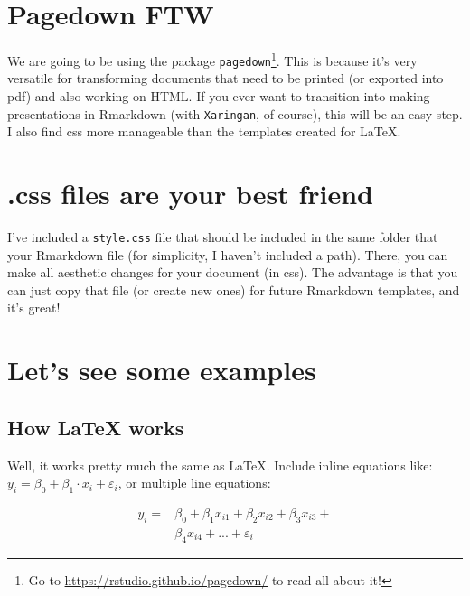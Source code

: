 \documentclass[
]{article}
\begin{document}
\hypertarget{pagedown-ftw}{%
\section{Pagedown FTW}\label{pagedown-ftw}}

We are going to be using the package \texttt{pagedown}\footnote{Go to
  \url{https://rstudio.github.io/pagedown/} to read all about it!}. This
is because it's very versatile for transforming documents that need to
be printed (or exported into pdf) and also working on HTML. If you ever
want to transition into making presentations in Rmarkdown (with
\texttt{Xaringan}, of course), this will be an easy step. I also find
css more manageable than the templates created for LaTeX.

\hypertarget{css-files-are-your-best-friend}{%
\section{.css files are your best
friend}\label{css-files-are-your-best-friend}}

I've included a \texttt{style.css} file that should be included in the
same folder that your Rmarkdown file (for simplicity, I haven't included
a path). There, you can make all aesthetic changes for your document (in
css). The advantage is that you can just copy that file (or create new
ones) for future Rmarkdown templates, and it's great!

\newpage

\hypertarget{lets-see-some-examples}{%
\section{Let's see some examples}\label{lets-see-some-examples}}

\hypertarget{how-latex-works}{%
\subsection{How LaTeX works}\label{how-latex-works}}

Well, it works pretty much the same as LaTeX. Include inline equations
like: \(y_i = \beta_0 + \beta_1\cdot x_i + \varepsilon_i\), or multiple
line equations:

\begin{align}
y_i =& \beta_0 + \beta_1 x_{i1} + \beta_2 x_{i2} + \beta_3 x_{i3} +\\
    &\beta_4 x_{i4} + ... + \varepsilon_{i}
\end{align}
\end{document}
